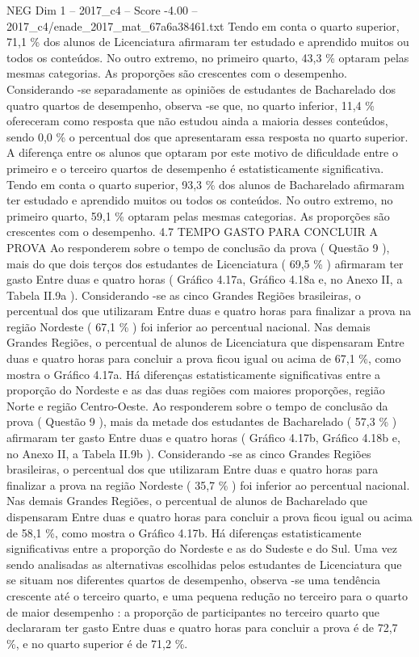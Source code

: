 \begin{textsample}{NEG Dim 1 – 2017\_c4 – Score -4.00 – 2017\_c4/enade\_2017\_mat\_67a6a38461.txt}
Tendo em conta o quarto superior, 71,1 \% dos alunos de Licenciatura afirmaram ter estudado e aprendido muitos ou todos os conteúdos.
No outro extremo, no primeiro quarto, 43,3 \% optaram pelas mesmas categorias.
As proporções são crescentes com o desempenho.
Considerando -se separadamente as opiniões de estudantes de Bacharelado dos quatro quartos de desempenho, observa -se que, no quarto inferior, 11,4 \% ofereceram como resposta que não estudou ainda a maioria desses conteúdos, sendo 0,0 \% o percentual dos que apresentaram essa resposta no quarto superior.
A diferença entre os alunos que optaram por este motivo de dificuldade entre o primeiro e o terceiro quartos de desempenho é estatisticamente significativa.
Tendo em conta o quarto superior, 93,3 \% dos alunos de Bacharelado afirmaram ter estudado e aprendido muitos ou todos os conteúdos.
No outro extremo, no primeiro quarto, 59,1 \% optaram pelas mesmas categorias.
As proporções são crescentes com o desempenho. 4.7 TEMPO GASTO PARA CONCLUIR A PROVA Ao responderem sobre o tempo de conclusão da prova ( Questão 9 ), mais do que dois terços dos estudantes de Licenciatura ( 69,5 \% ) afirmaram ter gasto Entre duas e quatro horas ( Gráfico 4.17a, Gráfico 4.18a e, no Anexo II, a Tabela II.9a ).
Considerando -se as cinco Grandes Regiões brasileiras, o percentual dos que utilizaram Entre duas e quatro horas para finalizar a prova na região Nordeste ( 67,1 \% ) foi inferior ao percentual nacional.
Nas demais Grandes Regiões, o percentual de alunos de Licenciatura que dispensaram Entre duas e quatro horas para concluir a prova ficou igual ou acima de 67,1 \%, como mostra o Gráfico 4.17a.
Há diferenças estatisticamente significativas entre a proporção do Nordeste e as das duas regiões com maiores proporções, região Norte e região Centro-Oeste.
Ao responderem sobre o tempo de conclusão da prova ( Questão 9 ), mais da metade dos estudantes de Bacharelado ( 57,3 \% ) afirmaram ter gasto Entre duas e quatro horas ( Gráfico 4.17b, Gráfico 4.18b e, no Anexo II, a Tabela II.9b ).
Considerando -se as cinco Grandes Regiões brasileiras, o percentual dos que utilizaram Entre duas e quatro horas para finalizar a prova na região Nordeste ( 35,7 \% ) foi inferior ao percentual nacional.
Nas demais Grandes Regiões, o percentual de alunos de Bacharelado que dispensaram Entre duas e quatro horas para concluir a prova ficou igual ou acima de 58,1 \%, como mostra o Gráfico 4.17b.
Há diferenças estatisticamente significativas entre a proporção do Nordeste e as do Sudeste e do Sul.
Uma vez sendo analisadas as alternativas escolhidas pelos estudantes de Licenciatura que se situam nos diferentes quartos de desempenho, observa -se uma tendência crescente até o terceiro quarto, e uma pequena redução no terceiro para o quarto de maior desempenho : a proporção de participantes no terceiro quarto que declararam ter gasto Entre duas e quatro horas para concluir a prova é de 72,7 \%, e no quarto superior é de 71,2 \%.

\end{textsample}
